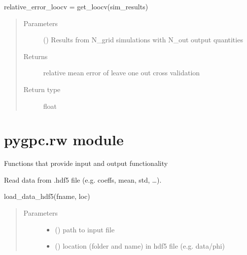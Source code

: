\documentclass[letterpaper,10pt,english,openany,oneside]{sphinxmanual}
\begin{document}
\begin{fulllineitems}
\begin{fulllineitems}
relative\_error\_loocv = get\_loocv(sim\_results)
\begin{quote}\begin{description}
\item[{Parameters}] \leavevmode
{} (\sphinxstyleliteralemphasis{\sphinxupquote{{[}}}\sphinxstyleliteralemphasis{\sphinxupquote{{]} }}) \textendash{} Results from N\_grid simulations with N\_out output quantities

\item[{Returns}] \leavevmode
{} \textendash{} relative mean error of leave one out cross validation

\item[{Return type}] \leavevmode
float

\end{description}\end{quote}

\end{fulllineitems}


\end{fulllineitems}



\section{pygpc.rw module}
\label{\detokenize{pygpc:module-pygpc.rw}}\label{\detokenize{pygpc:pygpc-rw-module}}
Functions that provide input and output functionality

\begin{fulllineitems}
\label{\detokenize{pygpc:pygpc.rw.read_data_hdf5}}
Read data from .hdf5 file (e.g. coeffs, mean, std, …).

load\_data\_hdf5(fname, loc)
\begin{quote}\begin{description}
\item[{Parameters}] \leavevmode\begin{itemize}
\item {} 
 () \textendash{} path to input file

\item {} 
 () \textendash{} location (folder and name) in hdf5 file (e.g. data/phi)

\end{itemize}

\end{description}\end{quote}

\end{fulllineitems}
\end{document}
